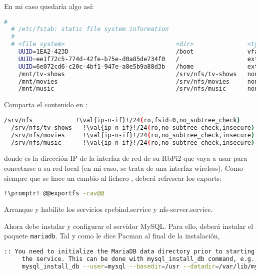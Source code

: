 \noindent En mi caso quedaría algo así:

\begin{lstlisting}[gobble=2,language=bash,style=bashinteract,escapechar=!]
  #
  # /etc/fstab: static file system information
  #
  # <file system>                               <dir>               <type>  <options> <dump>  <pass>
    UUID=1EA2-423D                              /boot               vfat    defaults  0       0
    UUID=ee1f72c5-774d-42fe-b75e-d0a85de734f0   /                   ext4    defaults  0       0
    UUID=6e072cd6-c20c-4bf1-947e-a8e5b9a88d3b   /home               ext4    defaults  0       2
    /mnt/tv-shows                               /srv/nfs/tv-shows   none    bind      0       0
    /mnt/movies                                 /srv/nfs/movies     none    bind      0       0
    /mnt/music                                  /srv/nfs/music      none    bind      0       0
\end{lstlisting}

Comparta el contenido en :

\begin{lstlisting}[gobble=2,language=bash,style=bashinteract,escapechar=!]
  /srv/nfs            !\val{ip-n-if}!/24(ro,fsid=0,no_subtree_check)
  /srv/nfs/tv-shows   !\val{ip-n-if}!/24(ro,no_subtree_check,insecure)
  /srv/nfs/movies     !\val{ip-n-if}!/24(ro,no_subtree_check,insecure)
  /srv/nfs/music      !\val{ip-n-if}!/24(ro,no_subtree_check,insecure)
\end{lstlisting}

\noindent donde  es la dirección IP de la interfaz de red de su RbPi2 que vaya a usar para
conectarse a su red local (en mi caso, se trata de una interfaz wireless). Como siempre que se hace un cambio al
fichero , deberá refrescar los exports:

\begin{lstlisting}[gobble=2,language=bash,style=bashinteract,escapechar=!]
  !\promptr! @@exportfs -rav@@
\end{lstlisting}

Arranque y habilite los servicios rpcbind.service y nfs-server.service.

Ahora debe instalar y configurar el servidor MySQL. Para ello, deberá instalar el paquete \lstinline+mariadb+.
Tal y como le dice Pacman al final de la instalación, 

\begin{lstlisting}[gobble=2,language=bash,style=bashinteract,escapechar=!]
  :: You need to initialize the MariaDB data directory prior to starting
     the service. This can be done with mysql_install_db command, e.g.:
     mysql_install_db --user=mysql --basedir=/usr --datadir=/var/lib/mysql
\end{lstlisting}

